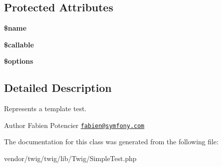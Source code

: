 \subsection*{Protected Attributes}
\begin{DoxyCompactItemize}
\item 
{\bfseries \$name}\hypertarget{classTwig__SimpleTest_a52ba38964d46d5ec98064e19d05ad0ff}{}\label{classTwig__SimpleTest_a52ba38964d46d5ec98064e19d05ad0ff}

\item 
{\bfseries \$callable}\hypertarget{classTwig__SimpleTest_a2803a384327a147254bf88457f2869b0}{}\label{classTwig__SimpleTest_a2803a384327a147254bf88457f2869b0}

\item 
{\bfseries \$options}\hypertarget{classTwig__SimpleTest_ace65d864324c733673aa7ff4782d5935}{}\label{classTwig__SimpleTest_ace65d864324c733673aa7ff4782d5935}

\end{DoxyCompactItemize}


\subsection{Detailed Description}
Represents a template test.

\begin{DoxyAuthor}{Author}
Fabien Potencier \href{mailto:fabien@symfony.com}{\tt fabien@symfony.\+com} 
\end{DoxyAuthor}


The documentation for this class was generated from the following file\+:\begin{DoxyCompactItemize}
\item 
vendor/twig/twig/lib/\+Twig/Simple\+Test.\+php\end{DoxyCompactItemize}
